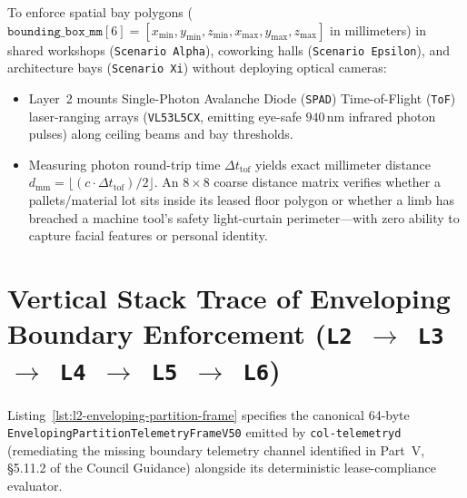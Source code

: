 To enforce spatial bay polygons ($\mathtt{bounding\_box\_mm}[6] = [x_{\min}, y_{\min}, z_{\min}, x_{\max}, y_{\max}, z_{\max}]$ in millimeters) in shared workshops (\texttt{Scenario Alpha}), coworking halls (\texttt{Scenario Epsilon}), and architecture bays (\texttt{Scenario Xi}) without deploying optical cameras:
\begin{itemize}
    \item Layer~2 mounts Single-Photon Avalanche Diode (\texttt{SPAD}) Time-of-Flight (\texttt{ToF}) laser-ranging arrays (\texttt{VL53L5CX}, emitting eye-safe $940\,\mathrm{nm}$ infrared photon pulses) along ceiling beams and bay thresholds.
    \item Measuring photon round-trip time $\Delta t_{\mathrm{tof}}$ yields exact millimeter distance $d_{\mathrm{mm}} = \lfloor (c \cdot \Delta t_{\mathrm{tof}}) / 2 \rfloor$. An $8 \times 8$ coarse distance matrix verifies whether a pallets/material lot sits inside its leased floor polygon or whether a limb has breached a machine tool's safety light-curtain perimeter---with zero ability to capture facial features or personal identity.
\end{itemize}

\section{Vertical Stack Trace of Enveloping Boundary Enforcement (\texttt{L2 $\to$ L3 $\to$ L4 $\to$ L5 $\to$ L6})}
\label{sec:l2-enveloping-vertical-trace}

Listing~\ref{lst:l2-enveloping-partition-frame} specifies the canonical 64-byte \texttt{EnvelopingPartitionTelemetryFrameV50} emitted by \texttt{col-telemetryd} (remediating the missing boundary telemetry channel identified in Part~V, \S5.11.2 of the Council Guidance) alongside its deterministic lease-compliance evaluator.

